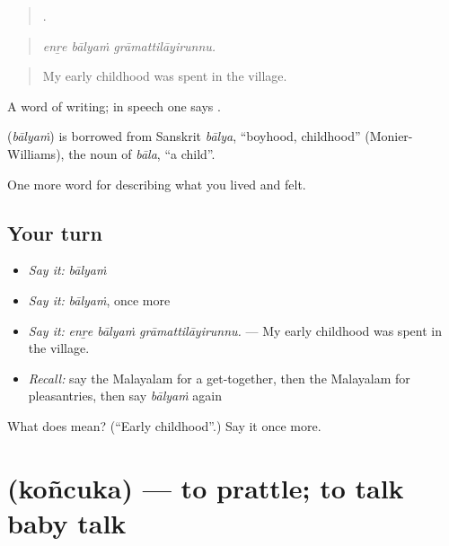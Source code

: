 \begin{quote}
  .
\end{quote}

\begin{quote}
\emph{enṟe bālyaṁ grāmattilāyirunnu.}
\end{quote}

\begin{quote}
My early childhood was spent in the village.
\end{quote}

A word of writing; in speech one says .

\begin{cousinweb}
\textbf{} (\emph{bālyaṁ}) is borrowed from Sanskrit \emph{bālya}, \textquotedblleft{}boyhood, childhood\textquotedblright{} (Monier-Williams), the noun of \emph{bāla}, \textquotedblleft{}a child\textquotedblright{}.
\end{cousinweb}

\begin{grammarlens}[title={What you've built}]
One more word for describing what you lived and felt.
\end{grammarlens}

\subsection*{Your turn}
\begin{itemize}
\raggedright
  \item \emph{Say it:} \emph{bālyaṁ}
  \item \emph{Say it:} \emph{bālyaṁ}, once more
  \item \emph{Say it:} \emph{enṟe bālyaṁ grāmattilāyirunnu.} — My early childhood was spent in the village.
  \item \emph{Recall:} say the Malayalam for a get-together, then the Malayalam for pleasantries, then say \emph{bālyaṁ} again
\end{itemize}

\begin{tcolorbox}[breakable,colback=teal!4,colframe=teal!35!black,title={Before you move on}]
What does  mean? (\textquotedblleft{}Early childhood\textquotedblright{}.) Say it once more.
\end{tcolorbox}
\section[\texorpdfstring{\ml{കൊഞ്ചുക} (koñcuka)}{കൊഞ്ചുക (koñcuka)}]{ (koñcuka) — to prattle; to talk baby talk}

